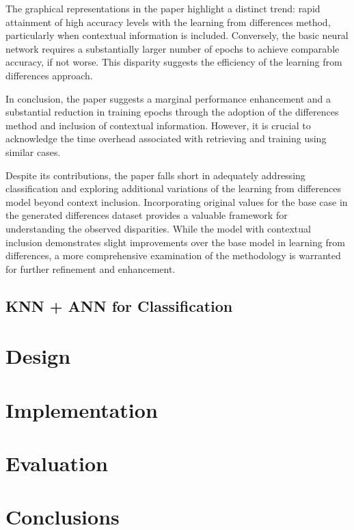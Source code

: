 \documentclass[a4paper, 12pt]{report}
\begin{document}
The graphical representations in the paper highlight a distinct trend: rapid attainment of high accuracy levels with the learning from differences method, 
particularly when contextual information is included. Conversely, the basic neural network requires a substantially larger number of epochs to achieve comparable accuracy, 
if not worse. This disparity suggests the efficiency of the learning from differences approach.

In conclusion, the paper suggests a marginal performance enhancement and a substantial reduction in training epochs through the adoption of the 
differences method and inclusion of contextual information. However, it is crucial to acknowledge the time overhead associated with retrieving and training using similar cases.

Despite its contributions, the paper falls short in adequately addressing classification and exploring additional variations of the learning from differences model beyond context inclusion. 
Incorporating original values for the base case in the generated differences dataset provides a valuable framework for understanding the observed disparities. 
While the model with contextual inclusion demonstrates slight improvements over the base model in learning from differences, a more comprehensive examination 
of the methodology is warranted for further refinement and enhancement.


\section{KNN + ANN for Classification}

\chapter{Design}
\label{ch:Design}

\chapter{Implementation}
\label{ch:Implementation}

\chapter{Evaluation}
\label{ch:Evaluation}

\chapter{Conclusions}
\label{ch:Conclusions}
\end{document}
